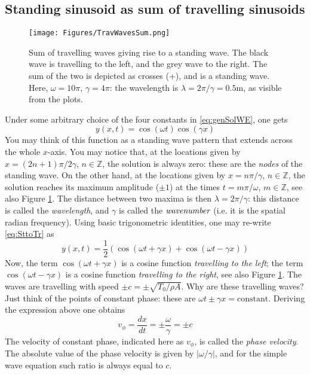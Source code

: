 \subsection{Standing sinusoid as sum of travelling sinusoids}
\begin{figure}[hbt]
\texttt{[image: Figures/TravWavesSum.png]}
\caption{Sum of travelling waves giving rise to a standing wave. The black wave is travelling to the left, and the grey wave to the right. The sum of the two is depicted as crosses (+), and is a standing wave. Here, $\omega = 10\pi$, $\gamma = 4\pi$: the wavelength is $\lambda = 2\pi/\gamma = 0.5$m, as visible from the plots.}\label{fig:travStd}
\end{figure}
Under some arbitrary choice of the four constants in \eqref{eq:genSolWE}, one gets
\begin{equation}\label{eq:SttoTr}
y(x,t) = \cos (\omega t )\cos (\gamma x )
\end{equation}
You may think of this function as a standing wave pattern that extends across the whole $x$-axis. You may notice that, at the locations given by $x = (2n+1)\pi /2 \gamma$, $n\in\mathbb Z$, the solution is always zero: these are the \emph{nodes} of the standing wave. On the other hand, at the locations given by $x = n\pi/\gamma$, $n\in\mathbb Z$, the solution reaches its maximum amplitude ($\pm 1$) at the times $t = m\pi/\omega$, $m\in\mathbb Z$, see also Figure \ref{fig:travStd}. The distance between two maxima is then $\lambda = 2\pi / \gamma$: this distance is called the \emph{wavelength}, and $\gamma$ is called the $\emph{wavenumber}$ (i.e. it is the spatial radian frequency). Using basic trigonometric identities, one may re-write \eqref{eq:SttoTr} as
\begin{equation}\label{eq:SumTrav}
y(x,t) = \frac{1}{2}\left(\cos (\omega t + \gamma x) + \cos (\omega t - \gamma x ) \right)
\end{equation}
Now, the term $\cos (\omega t + \gamma x)$ is a cosine function \emph{travelling to the left}; the term $\cos (\omega t - \gamma x )$ is a cosine function \emph{travelling to the right}, see also Figure \ref{fig:travStd}. The waves are travelling with speed $\pm c=\pm\sqrt{T_0/ \rho A}$. Why are these travelling waves? Just think of the points of constant phase: these are $\omega t \pm \gamma x = \text{constant}$.
Deriving the expression above one obtains
\begin{equation}
v_\phi = \frac{dx}{dt} = \pm \frac{\omega}{\gamma} = \pm c
\end{equation}
The velocity of constant phase, indicated here as $v_\phi$, is called the \emph{phase velocity}. The absolute value of the phase velocity is given by $|\omega/\gamma|$, and for the simple wave equation such ratio is always equal to $c$.

